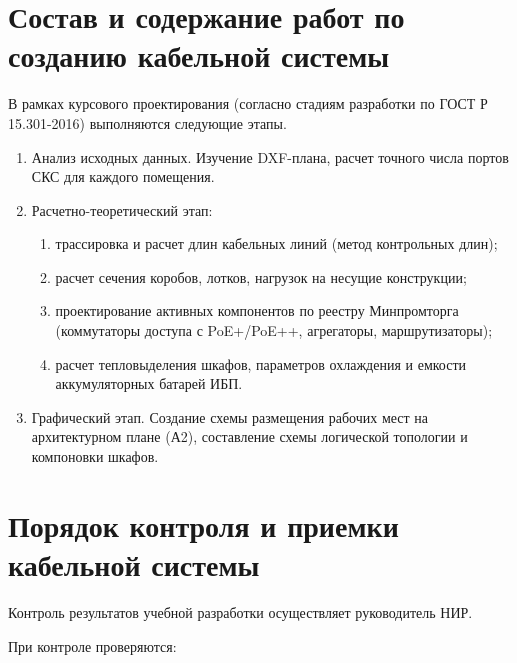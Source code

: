 \documentclass[a4paper,oneside,14pt]{extreport}
\begin{document}
\begin{appendices}

\section{Состав и содержание работ по созданию кабельной системы}
В рамках курсового проектирования (согласно стадиям разработки по ГОСТ Р 15.301-2016) выполняются следующие этапы.
\begin{enumerate}[label=\arabic{section}.\arabic*]
    \item Анализ исходных данных. Изучение DXF-плана, расчет точного числа портов СКС для каждого помещения.
    \item Расчетно-теоретический этап:
    \begin{enumerate}[label=\asbuk*)]
        \item трассировка и расчет длин кабельных линий (метод контрольных длин);
        \item расчет сечения коробов, лотков, нагрузок на несущие конструкции;
        \item проектирование активных компонентов по реестру Минпромторга (коммутаторы доступа с PoE+/PoE++, агрегаторы, маршрутизаторы);
        \item расчет тепловыделения шкафов, параметров охлаждения и емкости аккумуляторных батарей ИБП.
    \end{enumerate}
    \item Графический этап. Создание схемы размещения рабочих мест на архитектурном плане (А2), составление схемы логической топологии и компоновки шкафов.
\end{enumerate}


\section{Порядок контроля и приемки кабельной системы}

Контроль результатов учебной разработки осуществляет руководитель НИР.

При контроле проверяются:


\end{appendices}
\end{document}
